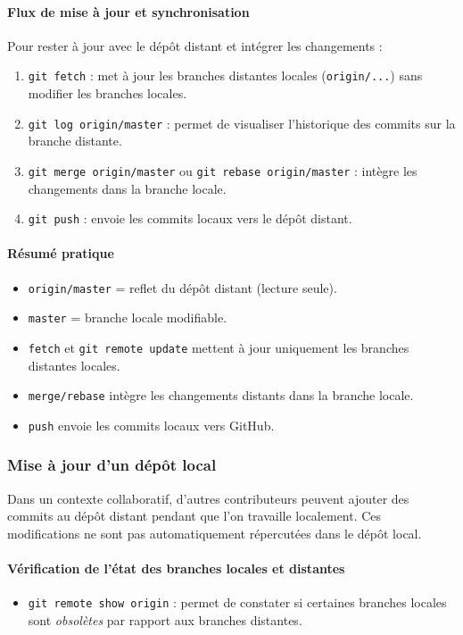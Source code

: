 \documentclass{article}
\begin{document}
\paragraph{Flux de mise à jour et synchronisation}
Pour rester à jour avec le dépôt distant et intégrer les changements :
\begin{enumerate}
    \item \texttt{git fetch} : met à jour les branches distantes locales (\texttt{origin/...}) sans modifier les branches locales.
    \item \texttt{git log origin/master} : permet de visualiser l’historique des commits sur la branche distante.
    \item \texttt{git merge origin/master} ou \texttt{git rebase origin/master} : intègre les changements dans la branche locale.
    \item \texttt{git push} : envoie les commits locaux vers le dépôt distant.
\end{enumerate}

\paragraph{Résumé pratique}
\begin{itemize}
    \item \texttt{origin/master} = reflet du dépôt distant (lecture seule).
    \item \texttt{master} = branche locale modifiable.
    \item \texttt{fetch} et \texttt{git remote update} mettent à jour uniquement les branches distantes locales.
    \item \texttt{merge/rebase} intègre les changements distants dans la branche locale.
    \item \texttt{push} envoie les commits locaux vers GitHub.
\end{itemize}

\subsubsection{Mise à jour d’un dépôt local}

Dans un contexte collaboratif, d’autres contributeurs peuvent ajouter des commits au dépôt distant pendant que l’on travaille localement. Ces modifications ne sont pas automatiquement répercutées dans le dépôt local.  

\paragraph{Vérification de l’état des branches locales et distantes}
\begin{itemize}
    \item \texttt{git remote show origin} : permet de constater si certaines branches locales sont \emph{obsolètes} par rapport aux branches distantes.
\end{itemize}
\end{document}
